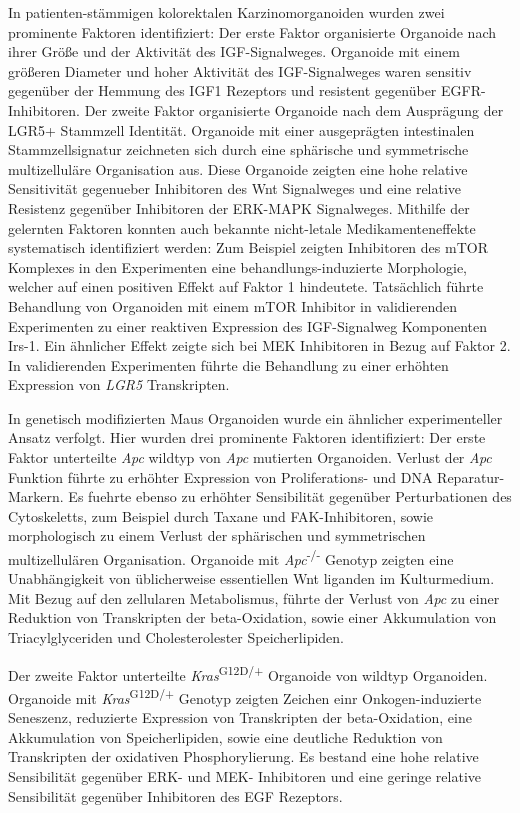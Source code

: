 In patienten-stämmigen kolorektalen Karzinomorganoiden wurden zwei prominente Faktoren identifiziert: Der erste Faktor organisierte Organoide nach ihrer Größe und der Aktivität des IGF-Signalweges. Organoide mit einem größeren Diameter und hoher Aktivität des IGF-Signalweges waren sensitiv gegenüber der Hemmung des IGF1 Rezeptors und resistent gegenüber EGFR-Inhibitoren. 
\smallbreak
Der zweite Faktor organisierte Organoide nach dem Ausprägung der LGR5+ Stammzell Identität. Organoide mit einer ausgeprägten intestinalen Stammzellsignatur zeichneten sich durch eine sphärische und symmetrische multizelluläre Organisation aus. Diese Organoide zeigten eine hohe relative Sensitivität gegenueber Inhibitoren des Wnt Signalweges und eine relative Resistenz gegenüber Inhibitoren der ERK-MAPK Signalweges. 
\smallbreak
Mithilfe der gelernten Faktoren konnten auch bekannte nicht-letale Medikamenteneffekte systematisch identifiziert werden: Zum Beispiel zeigten Inhibitoren des mTOR Komplexes in den Experimenten eine behandlungs-induzierte Morphologie, welcher auf einen positiven Effekt auf Faktor 1 hindeutete. Tatsächlich führte Behandlung von Organoiden mit einem mTOR Inhibitor in validierenden Experimenten zu einer reaktiven Expression des IGF-Signalweg Komponenten Irs-1. Ein ähnlicher Effekt zeigte sich bei MEK Inhibitoren in Bezug auf Faktor 2. In validierenden Experimenten führte die Behandlung zu einer erhöhten Expression von \textit{LGR5} Transkripten.
\bigbreak

In genetisch modifizierten Maus Organoiden wurde ein ähnlicher experimenteller Ansatz verfolgt. Hier wurden drei prominente Faktoren identifiziert: Der erste Faktor unterteilte \textit{Apc} wildtyp von \textit{Apc} mutierten Organoiden. Verlust der \textit{Apc} Funktion führte zu erhöhter Expression von Proliferations- und DNA Reparatur-Markern. Es fuehrte ebenso zu erhöhter Sensibilität gegenüber Perturbationen des Cytoskeletts, zum Beispiel durch Taxane und FAK-Inhibitoren, sowie morphologisch zu einem Verlust der sphärischen und symmetrischen multizellulären Organisation. Organoide mit \textit{Apc}\textsuperscript{-/-} Genotyp zeigten eine Unabhängigkeit von üblicherweise essentiellen Wnt liganden im Kulturmedium. Mit Bezug auf den zellularen Metabolismus, führte der Verlust von \textit{Apc} zu einer Reduktion von Transkripten der beta-Oxidation, sowie einer Akkumulation von Triacylglyceriden und Cholesterolester Speicherlipiden.
\bigbreak

Der zweite Faktor unterteilte \textit{Kras}\textsuperscript{G12D/+} Organoide von wildtyp Organoiden. Organoide mit \textit{Kras}\textsuperscript{G12D/+} Genotyp zeigten Zeichen einr Onkogen-induzierte Seneszenz, reduzierte  Expression von Transkripten der beta-Oxidation, eine Akkumulation von Speicherlipiden, sowie eine deutliche Reduktion von Transkripten der oxidativen Phosphorylierung. Es bestand eine hohe relative Sensibilität gegenüber ERK- und MEK- Inhibitoren und eine geringe relative Sensibilität gegenüber Inhibitoren des EGF Rezeptors. 
\bigbreak

